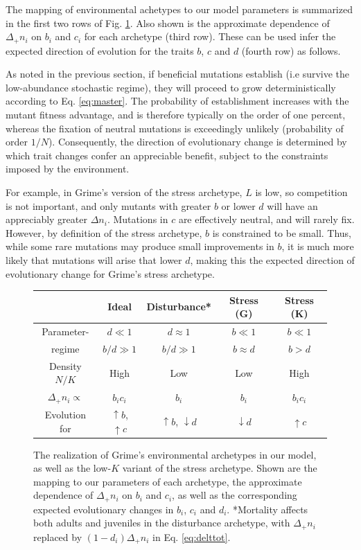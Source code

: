 \documentclass[11pt]{article}
\begin{document}
The mapping of environmental achetypes to our model parameters is summarized in the first two rows of Fig. \ref{fig:table}. Also shown is the approximate dependence of $\Delta_+ n_i$ on $b_i$ and $c_i$ for each archetype (third row). These can be used infer the expected direction of evolution for the traits $b$, $c$ and $d$ (fourth row) as follows. 

As noted in the previous section, if beneficial mutations establish (i.e survive the low-abundance stochastic regime), they will proceed to grow deterministically according to Eq. \eqref{eq:master}. The probability of establishment increases with the mutant fitness advantage, and is therefore typically on the order of one percent, whereas the fixation of neutral mutations is exceedingly unlikely (probability of order $1/N$). Consequently, the direction of evolutionary change is determined by which trait changes confer an appreciable benefit, subject to the constraints imposed by the environment. 

For example, in Grime's version of the stress archetype, $L$ is low, so competition is not important, and only mutants with greater $b$ or lower $d$ will have an appreciably greater $\Delta n_i$. Mutations in $c$ are effectively neutral, and will rarely fix. However, by definition of the stress archetype, $b$ is constrained to be small. Thus, while some rare mutations may produce small improvements in $b$, it is much more likely that mutations will arise that lower $d$, making this the expected direction of evolutionary change for Grime's stress archetype. 

\begin{figure}
\centering
\begin{tabular}{*{5}{c}}
  & Ideal & Disturbance* & Stress (G) & Stress (K) \\ \hline
  Parameter- & $d \ll 1$ & $d \approx 1$ & $b \ll 1$ & $b \ll 1$ \\
  regime & $b/d\gg 1$ & $b/d\gg 1$ & $b\approx d$ & $b>d$ \\
  Density $N/K$  & High & Low & Low & High \\
  $\Delta_+ n_i\propto$ & $b_i c_i$ & $b_i$ & $b_i$ & $b_i c_i$ \\
  Evolution for & $\uparrow b$, $ \uparrow c$ & $\uparrow b$, $\downarrow d$ & $\downarrow d$ & $\uparrow c$
\end{tabular}
\caption{\label{fig:table} The realization of Grime's environmental archetypes in our model, as well as the low-$K$ variant of the stress archetype. Shown are the mapping to our parameters of each archetype, the approximate dependence of $\Delta_+ n_i$ on $b_i$ and $c_i$, as well as the corresponding expected evolutionary changes in $b_i$, $c_i$ and $d_i$. *Mortality affects both adults and juveniles in the disturbance archetype, with $\Delta_+ n_i$ replaced by $(1-d_i)\Delta_+ n_i$ in Eq. \eqref{eq:delttot}.}
\end{figure}
\end{document}
